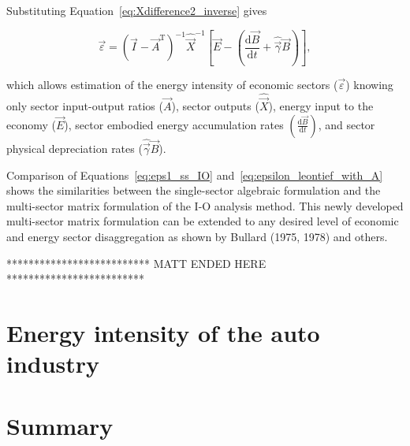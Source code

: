 \noindent{}Substituting Equation~\ref{eq:Xdifference2_inverse} gives

\begin{equation} \label{eq:epsilon_leontief_with_A}
	\vec{\varepsilon} 
	= {(\vec{I} - \vec{A}^{\mathrm{T}})}^{-1}\hat{\vec{X}}^{-1}
		\left[\vec{E} 
				- \left(\frac{\mathrm{d}\vec{B}}{\mathrm{d}t} 
				+ \hat{\vec{\gamma}}\vec{B}\right)
		\right],
\end{equation}

\noindent{}which allows estimation of the energy intensity of economic sectors ($\vec{\varepsilon}$) knowing only sector input-output ratios ($\vec{A}$), sector outputs ($\hat{\vec{X}}$), energy input to the economy ($\vec{E}$), sector embodied energy accumulation rates $\left(\frac{\mathrm{d}\vec{B}}{\mathrm{d}t}\right)$, and sector physical depreciation rates ($\hat{\vec{\gamma}}\vec{B}$).

Comparison of Equations~\ref{eq:eps1_ss_IO} and~\ref{eq:epsilon_leontief_with_A} shows the similarities between the single-sector algebraic formulation and the multi-sector matrix formulation of the I-O analysis method. This newly developed multi-sector matrix formulation can be extended to any desired level of economic and energy sector disaggregation as shown by Bullard (1975, 1978) and others.

************************** MATT ENDED HERE *************************


\section{Energy intensity of the auto industry}
\label{sec:intensity_auto}

\section{Summary}
\label{sec:intensity_summary}



